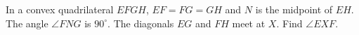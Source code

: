 In a convex quadrilateral $EFGH$, $EF=FG=GH$ and $N$ is the midpoint of $EH$. The angle $\angle FNG$ is $90^\circ$. The diagonals $EG$ and $FH$ meet at $X$. Find $\angle EXF$.
